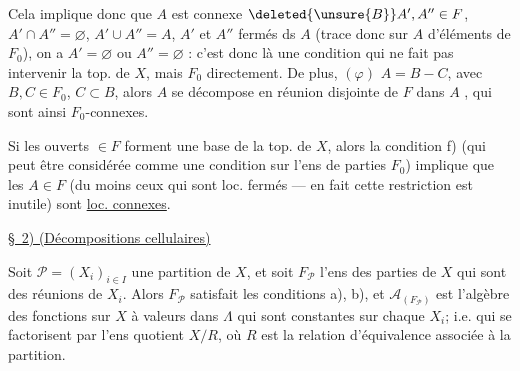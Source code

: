 
Cela implique donc que $A$  est connexe   $\deleted{\unsure{B}}A',A''\in F$, $A'\cap A''=\varnothing$, $A'\cup A''=A$, $A'$ et $A''$ fermés ds $A$ (trace donc sur $A$ d'éléments de $F_0$), on a $A'=\varnothing$ ou $A''=\varnothing$ : c'est donc là une condition qui ne fait pas intervenir la top. de $X$, mais $F_0$ directement. De plus,  $(\varphi)$ $A=B-C$, avec $B,C\in F_0$, $C\subset B$, alors $A$ se décompose en réunion disjointe   de $F$  dans $A$ , qui sont ainsi $F_0$-connexes. 

Si les ouverts $\in F$ forment une base de la top. de $X$, alors la condition f) (qui peut être considérée comme une condition sur l'ens de parties $F_0$) implique que les $A\in F$ (du moins ceux qui sont loc. fermés --- en fait cette restriction est inutile) sont \uline{loc. connexes}.



\uline{\S\ 2) (Décompositions cellulaires)} 

Soit $\mathcal P=(X_i)_{i\in I}$ une partition  de $X$, et soit $F_{\mathcal P}$ l'ens des parties de $X$ qui sont des réunions  de $X_i$. Alors  $F_{\mathcal P}$ satisfait les conditions a), b), et $\mathcal A_{(F_{\mathcal P})}$ est l'algèbre des fonctions sur $X$ à valeurs dans $\Lambda$ qui sont constantes sur chaque $X_i$; i.e. qui se factorisent par l'ens quotient $X/R$, où $R$  est la relation d'équivalence associée à la partition.




